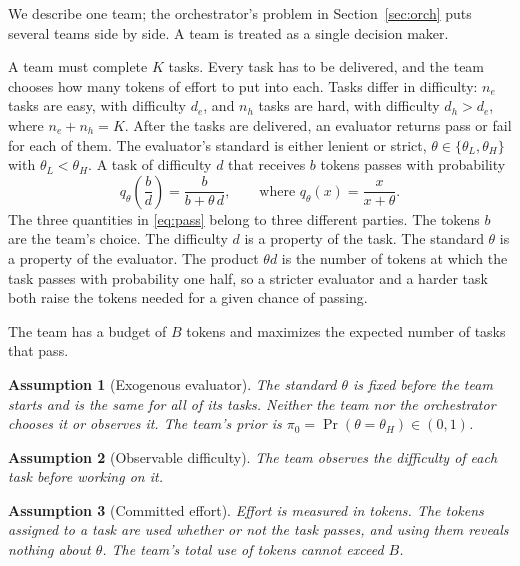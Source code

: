 \documentclass[11pt]{article}
\newtheorem{assumption}{Assumption}
\begin{document}
We describe one team; the orchestrator's problem in Section~\ref{sec:orch} puts several teams side by side. A team is treated as a single decision maker.

A team must complete $K$ tasks. Every task has to be delivered, and the team chooses how many tokens of effort to put into each. Tasks differ in difficulty: $n_e$ tasks are easy, with difficulty $d_e$, and $n_h$ tasks are hard, with difficulty $d_h>d_e$, where $n_e+n_h=K$. After the tasks are delivered, an evaluator returns pass or fail for each of them. The evaluator's standard is either lenient or strict, $\theta\in\{\theta_L,\theta_H\}$ with $\theta_L<\theta_H$. A task of difficulty $d$ that receives $b$ tokens passes with probability
\begin{equation}\label{eq:pass}
q_\theta\!\left(\frac{b}{d}\right)=\frac{b}{b+\theta\,d},\qquad\text{where } q_\theta(x)=\frac{x}{x+\theta}.
\end{equation}
The three quantities in \eqref{eq:pass} belong to three different parties. The tokens $b$ are the team's choice. The difficulty $d$ is a property of the task. The standard $\theta$ is a property of the evaluator. The product $\theta d$ is the number of tokens at which the task passes with probability one half, so a stricter evaluator and a harder task both raise the tokens needed for a given chance of passing.

The team has a budget of $B$ tokens and maximizes the expected number of tasks that pass.

\begin{assumption}[Exogenous evaluator]\label{as:eval}
The standard $\theta$ is fixed before the team starts and is the same for all of its tasks. Neither the team nor the orchestrator chooses it or observes it. The team's prior is $\pi_0=\Pr(\theta=\theta_H)\in(0,1)$.
\end{assumption}

\begin{assumption}[Observable difficulty]\label{as:diff}
The team observes the difficulty of each task before working on it.
\end{assumption}

\begin{assumption}[Committed effort]\label{as:effort}
Effort is measured in tokens. The tokens assigned to a task are used whether or not the task passes, and using them reveals nothing about $\theta$. The team's total use of tokens cannot exceed $B$.
\end{assumption}
\end{document}

